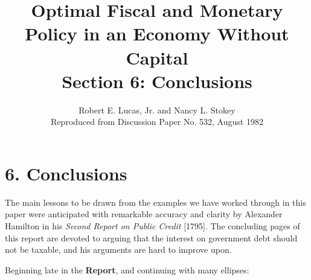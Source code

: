 \documentclass[12pt]{article}
\title{Optimal Fiscal and Monetary Policy in an Economy Without Capital\\
\large Section 6: Conclusions}
\author{Robert E. Lucas, Jr. and Nancy L. Stokey\\
\small Reproduced from Discussion Paper No. 532, August 1982}
\date{}
\begin{document}
\maketitle

\section*{6. Conclusions}

The main lessons to be drawn from the examples we have worked through in this paper were anticipated with remarkable accuracy and clarity by Alexander Hamilton in his \textit{Second Report on Public Credit} [1795]. The concluding pages of this report are devoted to arguing that the interest on government debt should not be taxable, and his arguments are hard to improve upon.

Beginning late in the \textbf{Report}, and continuing with many ellipses:
\end{document}
